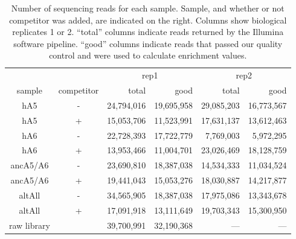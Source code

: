 \begin{table}[h!]\footnotesize %
\center
\caption[Number of sequencing reads for each
sample] {Number of sequencing reads for each
sample. Sample, and whether or not competitor was added, are indicated
on the right. Columns show biological replicates 1 or 2. ``total''
columns indicate reads returned by the Illumina software pipeline. ``good''
columns indicate reads that passed our quality control and were used
to calculate enrichment values.}
\scriptsize
\begin{tabular}{cc|rr|rr}
 &  & \multicolumn{2}{c|}{rep1} & \multicolumn{2}{c}{rep2}\tabularnewline
sample & competitor & total & good & total & good\tabularnewline
\hline 
hA5 & - & 24,794,016 & 19,695,958 & 29,085,203 & 16,773,567\tabularnewline
hA5 & + & 15,053,706 & 11,523,991 & 17,631,137 & 13,612,463\tabularnewline
\hline 
hA6 & - & 22,728,393 & 17,722,779 & 7,769,003 & 5,972,295\tabularnewline
hA6 & + & 13,953,466 & 11,004,701 & 23,026,469 & 18,128,759\tabularnewline
\hline 
ancA5/A6 & - & 23,690,810 & 18,387,038 & 14,534,333 & 11,034,524\tabularnewline
ancA5/A6 & + & 19,441,043 & 15,053,276 & 18,030,887 & 14,217,877\tabularnewline
\hline 
altAll & - & 34,565,905 & 18,387,038 & 17,975,086 & 13,343,678\tabularnewline
altAll & + & 17,091,918 & 13,111,649 & 19,703,343 & 15,300,950\tabularnewline
\hline 
raw library &  & 39,700,991 & 32,190,368 & --- & ---\tabularnewline
\end{tabular}
\end{table}



